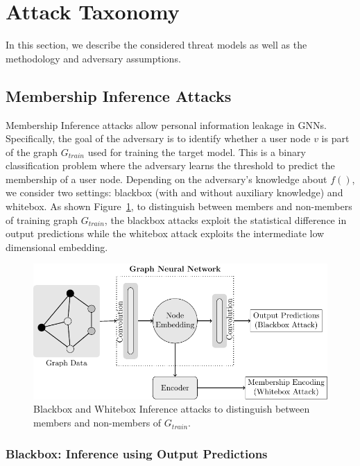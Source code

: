 \section{Attack Taxonomy}\label{attack}

In this section, we describe the considered threat models as well as the methodology and adversary assumptions.


\subsection{Membership Inference Attacks}

Membership Inference attacks allow personal information leakage in GNNs.
Specifically, the goal of the adversary is to identify whether a user node $v$ is part of the graph $G_{train}$ used for training the target model.
This is a binary classification problem where the adversary learns the threshold to predict the membership of a user node.
Depending on the adversary's knowledge about $f()$, we consider two settings: blackbox (with and without auxiliary knowledge) and whitebox. %
As shown Figure~\ref{mia}, to distinguish between members and non-members of training graph $G_{train}$, the blackbox attacks exploit the statistical difference in output predictions while the whitebox attack exploits the intermediate low dimensional embedding.


\begin{figure}[!htb]
\centering
\includegraphics[width=0.85\linewidth]{./figures/Attacks/MIA.pdf}
\caption{Blackbox and Whitebox Inference attacks to distinguish between members and non-members of $G_{train}$.}
\label{mia}
\end{figure}


\subsubsection{Blackbox: Inference using Output Predictions}

